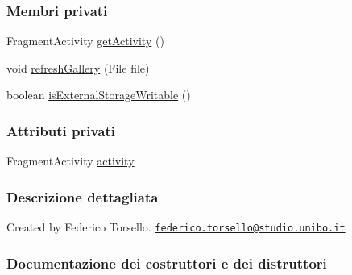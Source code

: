 \subsubsection*{Membri privati}
\begin{DoxyCompactItemize}
\item 
Fragment\+Activity \hyperlink{classit_1_1unibo_1_1torsello_1_1bluetoothpositioning_1_1task_1_1SaveImageTask_a6fda270f42937b64e3767644e7dd63a5_a6fda270f42937b64e3767644e7dd63a5}{get\+Activity} ()
\item 
void \hyperlink{classit_1_1unibo_1_1torsello_1_1bluetoothpositioning_1_1task_1_1SaveImageTask_a813b3e0d75f59558de551aa6251e3d08_a813b3e0d75f59558de551aa6251e3d08}{refresh\+Gallery} (File file)
\item 
boolean \hyperlink{classit_1_1unibo_1_1torsello_1_1bluetoothpositioning_1_1task_1_1SaveImageTask_a676fc75dd0bd436fdf8f9e80d4aae873_a676fc75dd0bd436fdf8f9e80d4aae873}{is\+External\+Storage\+Writable} ()
\end{DoxyCompactItemize}
\subsubsection*{Attributi privati}
\begin{DoxyCompactItemize}
\item 
Fragment\+Activity \hyperlink{classit_1_1unibo_1_1torsello_1_1bluetoothpositioning_1_1task_1_1SaveImageTask_a340aca6a2cdcfbf41aed236588669203_a340aca6a2cdcfbf41aed236588669203}{activity}
\end{DoxyCompactItemize}


\subsubsection{Descrizione dettagliata}
Created by Federico Torsello. \href{mailto:federico.torsello@studio.unibo.it}{\tt federico.\+torsello@studio.\+unibo.\+it} 

\subsubsection{Documentazione dei costruttori e dei distruttori}
\hypertarget{classit_1_1unibo_1_1torsello_1_1bluetoothpositioning_1_1task_1_1SaveImageTask_a73b35fbe1482ff046cc46ce21440824e_a73b35fbe1482ff046cc46ce21440824e}{}\label{classit_1_1unibo_1_1torsello_1_1bluetoothpositioning_1_1task_1_1SaveImageTask_a73b35fbe1482ff046cc46ce21440824e_a73b35fbe1482ff046cc46ce21440824e} 
